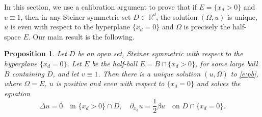 \documentclass[11pt]{article}
\numberwithin{equation}{section}
\theoremstyle{plain}
\newtheorem{prop}[teo]{Proposition}
\theoremstyle{definition}
\def\R{\mathbb{R}}
\begin{document}
In this section, we use a calibration argument to prove that if $E=\{x_d>0\}$ and $v\equiv 1$, then in any Steiner symmetric set $D\subset\R^d$, the solution $(\Omega,u)$ is unique, $u$ is even with respect to the hyperplane $\{x_d=0\}$ and $\Omega$ is precisely the half-space $E$. Our main result is the following.
\begin{prop}
Let $D$ be an open set, Steiner symmetric with respect to the hyperplane $\{x_d=0\}$. Let $E$ be the half-ball $E=B\cap\{x_d>0\}$, for some large ball $B$ containing $D$, and let $v\equiv 1$. Then there is a unique solution $(u,\Omega)$ to \eqref{e:pb}, where $\Omega=E$, $u$ is positive and even with respect to $\{x_d=0\}$ and solves the equation
\begin{equation}\label{e:esempio}
\Delta u=0\quad\text{in } \{x_d>0\}\cap D,\quad \partial_{x_d} u=\frac{1}2\beta u\quad\text{on } D\cap\{x_d=0\}.
\end{equation}
\end{prop}
\end{document}
